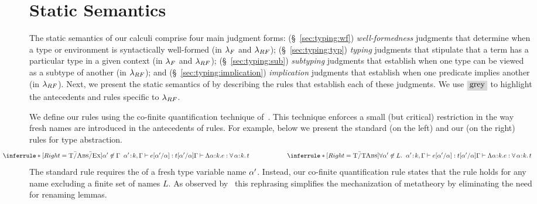 \section{Static Semantics}
\label{sec:lang:static}

The static semantics of our calculi comprise
four main judgment forms:
%
(\S~\ref{sec:typing:wf}) {\emph{well-formedness}} judgments that determine when a type
or environment is syntactically well-formed (in $\lambda_{F}$ and $\lambda_{RF}$);
%
(\S~\ref{sec:typing:typ}) {\emph{typing}} judgments that stipulate that a term has
a particular type in a given context (in $\lambda_{F}$ and $\lambda_{RF}$);
%
(\S~\ref{sec:typing:sub}) {\emph{subtyping}} judgments that establish when one type can
be viewed as a subtype of another (in $\lambda_{RF}$); and
%
(\S~\ref{sec:typing:implication}) {\emph{implication}} judgments that establish when one predicate
implies another (in $\lambda_{RF}$).
%
Next, we present the static semantics of \sysrf by describing
the rules that establish 
each of these judgments.
%
We use $\greybox{\mbox{grey}}$ to highlight the antecedents and rules
specific to $\lambda_{RF}$.
%

\begin{fullversion}

%
We define our rules using the co-finite quantification technique
of~\citet{AydemirCPPW08}.
%
This technique enforces a small (but critical) restriction
in the way fresh names are introduced in the antecedents of rules.
%
For example, below we present the standard (on the left)
and our (on the right) rules for type abstraction.
$$
\hspace{-0.60in}
\inferrule*[Right=\tAbsEx]
    {\notmem{\al'}{\tcenv} \;\;
      \hastype{\bind{\al'}{\skind},\tcenv}{\subst{\sexpr}{\al}{\al'}}{\subst{\stype}{\al}{\al'}} }
    {\hastype{\tcenv}{\tabs{\al}{\skind}{\sexpr}}{\polytype{\al}{\skind}{\stype}}}
\qquad\qquad\qquad
\inferrule*[Right=\tTAbs]
    {\forall\notmem{\al'}{L}. \;\;
      \hastype{\bind{\al'}{\skind},\tcenv}{\subst{\sexpr}{\al}{\al'}}{\subst{\stype}{\al}{\al'}} }
    {\hastype{\tcenv}{\tabs{\al}{\skind}{\sexpr}}{\polytype{\al}{\skind}{\stype}}}
$$
%
The standard rule \tAbsEx requires the  of a
fresh type variable name $\alpha'$.
%
Instead, our co-finite quantification rule
states that the rule holds for any name excluding
a finite set of names $L$. %
%
As observed by~\citet{AydemirCPPW08} this rephrasing
simplifies the mechanization of metatheory
by eliminating the need for renaming lemmas.

\end{fullversion}

